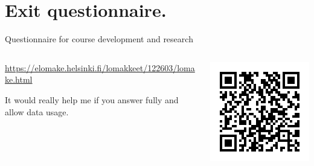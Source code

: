 \documentclass[11pt, aspectratio=169, table]{beamer}
\begin{document}
\section{Exit questionnaire.}
\begin{frame}{Questionnaire for course development and research}
\begin{columns}
\begin{column}{0.4\textwidth}
\setlength\parskip{1em}
\url{https://elomake.helsinki.fi/lomakkeet/122603/lomake.html}

It would really help me if you answer fully and allow data usage.
\end{column}
\begin{column}{0.6\textwidth}
\includegraphics{elomakeqr}
\end{column}
\end{columns}
\end{frame}

%
\end{document}
